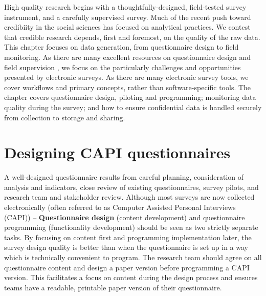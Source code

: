 
\begin{fullwidth}
High quality research begins with a thoughtfully-designed, field-tested survey instrument, and a carefully supervised survey. 
Much of the recent push toward credibiity in the social sciences has focused on analytical practices. 
We contest that credible research depends, first and foremost, on the quality of the raw data. This chapter focuses on data generation, from questionnaire design to field monitoring. As there are many excellent resources on questionnaire design and field supervision , we focus on the particularly challenges and opportunities presented by electronic surveys. As there are many electronic survey tools, we cover workflows and primary concepts, rather than software-specific tools. The chapter covers questionnaire design, piloting and programming; monitoring data quality during the survey; and how to ensure confidential data is handled securely from collection to storage and sharing. 
	

\end{fullwidth}


\section{Designing CAPI questionnaires}
A well-designed questionnaire results from careful planning, consideration of analysis and indicators, close review of existing questionnaires, survey pilots, and research team and stakeholder review. 
Although most surveys are now collected electronically (often referred to as Computer Assisted Personal Interviews (CAPI)) -- 
\textbf{Questionnaire design}
(content development) and questionnaire programming (functionality development) should be seen as two strictly separate tasks. By focusing on content first and programming implementation later, the survey design quality is better than when the questionnaire is set up in a way which is technically convenient to program. The research team should agree on all questionnaire content and design a paper version before programming a CAPI version. This facilitates a focus on content during the design process and ensures teams have a readable, printable paper version of their questionnaire.  


